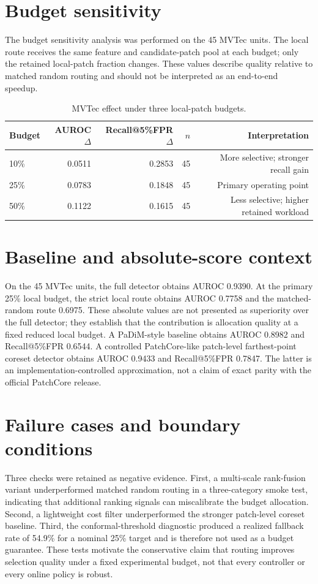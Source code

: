 \documentclass[pdflatex,sn-vancouver-num]{sn-jnl}
\begin{document}
\section{Budget sensitivity}
The budget sensitivity analysis was performed on the 45 MVTec units. The local route receives the same feature and candidate-patch pool at each budget; only the retained local-patch fraction changes. These values describe quality relative to matched random routing and should not be interpreted as an end-to-end speedup.

\begin{table}[ht]
\caption{MVTec effect under three local-patch budgets.}
\label{tab:budget}
\begin{tabularx}{\textwidth}{lrrrr}
\toprule
Budget & AUROC $\Delta$ & Recall@5\%FPR $\Delta$ & $n$ & Interpretation \\
\midrule
10\% & 0.0511 & 0.2853 & 45 & More selective; stronger recall gain \\
25\% & 0.0783 & 0.1848 & 45 & Primary operating point \\
50\% & 0.1122 & 0.1615 & 45 & Less selective; higher retained workload \\
\bottomrule
\end{tabularx}
\end{table}

\section{Baseline and absolute-score context}
On the 45 MVTec units, the full detector obtains AUROC 0.9390. At the primary 25\% local budget, the strict local route obtains AUROC 0.7758 and the matched-random route 0.6975. These absolute values are not presented as superiority over the full detector; they establish that the contribution is allocation quality at a fixed reduced local budget. A PaDiM-style baseline obtains AUROC 0.8982 and Recall@5\%FPR 0.6544. A controlled PatchCore-like patch-level farthest-point coreset detector obtains AUROC 0.9433 and Recall@5\%FPR 0.7847. The latter is an implementation-controlled approximation, not a claim of exact parity with the official PatchCore release.

\section{Failure cases and boundary conditions}
Three checks were retained as negative evidence. First, a multi-scale rank-fusion variant underperformed matched random routing in a three-category smoke test, indicating that additional ranking signals can miscalibrate the budget allocation. Second, a lightweight cost filter underperformed the stronger patch-level coreset baseline. Third, the conformal-threshold diagnostic produced a realized fallback rate of 54.9\% for a nominal 25\% target and is therefore not used as a budget guarantee. These tests motivate the conservative claim that routing improves selection quality under a fixed experimental budget, not that every controller or every online policy is robust.
\end{document}
